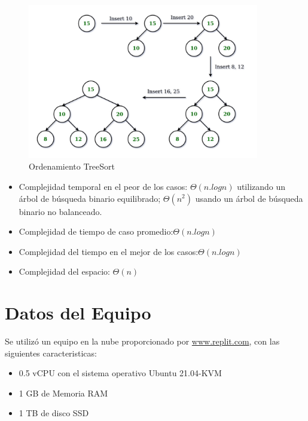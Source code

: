 \documentclass{article}
\begin{document}
\begin{figure}[H]
\centering
\includegraphics[width=0.9\textwidth]{img/treeejem.jpg}
\caption{Ordenamiento TreeSort}
\label{fig:QuickSort}
\end{figure}


 \begin{itemize}
          \item Complejidad temporal en el peor de los casos: $\Theta (n.log n)$  utilizando un árbol de búsqueda binario equilibrado; $\Theta (n^2)$ usando un árbol de búsqueda binario no balanceado.
           \item Complejidad de tiempo de caso promedio:$\Theta (n.log n)$
           \item Complejidad del tiempo en el mejor de los casos:$\Theta (n.log n)$
           \item Complejidad del espacio: $\Theta (n)$

\end{itemize}

    
    
    
    \section{Datos del Equipo}
    Se utilizó un equipo en la nube proporcionado por \href{https://replit.com/~}{www.replit.com}, con las siguientes caracteristicas:

    \begin{itemize}
        \item 0.5 vCPU con el sistema operativo Ubuntu 21.04-KVM
        \item 1 GB de Memoria RAM
        \item 1 TB de disco SSD
    \end{itemize}
\end{document}

